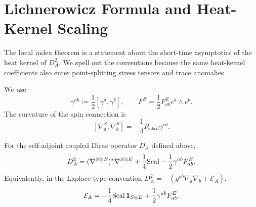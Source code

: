 \section{Lichnerowicz Formula and Heat-Kernel Scaling}

The local index theorem is a statement about the short-time asymptotics of
the heat kernel of \(D_A^2\).  We spell out the conventions because the same
heat-kernel coefficients also enter point-splitting stress tensors and trace
anomalies.

We use
\[
  \gamma^{ab}:=\frac12[\gamma^a,\gamma^b],
  \qquad
  F^E=\frac12F^E_{ab}e^a\wedge e^b .
\]
The curvature of the spin connection is
\[
  [\nabla_a^S,\nabla_b^S]
  =
  -\frac14 R_{ab cd}\gamma^{cd}.
\]

\begin{lemma}
\label{lem:index-lichnerowicz}
For the self-adjoint coupled Dirac operator \(D_A\) defined above,
\begin{equation}
  D_A^2
  =
  (\nabla^{S\otimes E})^\ast\nabla^{S\otimes E}
  +\frac14{\rm Scal}
  -\frac12\gamma^{ab}F^E_{ab}.
  \label{eq:index-lichnerowicz}
\end{equation}
Equivalently, in the Laplace-type convention
\(D_A^2=-(g^{ab}\nabla_a\nabla_b+\mathcal E_A)\),
\begin{equation}
  \mathcal E_A
  =
  -\frac14{\rm Scal}\,{\bf 1}_{S\otimes E}
  +\frac12\gamma^{ab}F^E_{ab}.
  \label{eq:index-dirac-laplace-endomorphism}
\end{equation}
\end{lemma}


